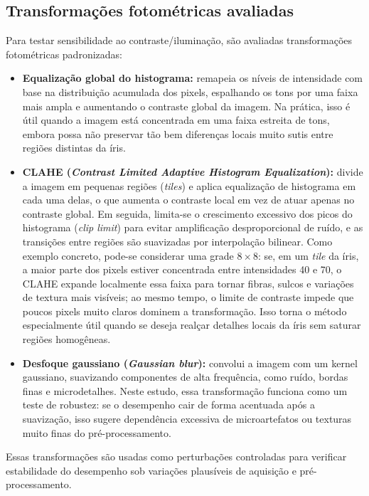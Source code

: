 \documentclass[11pt,a4paper]{article}
\begin{document}
\subsection{Transformações fotométricas avaliadas}
\label{ref:transformacoes}
Para testar sensibilidade ao contraste/iluminação, são avaliadas transformações fotométricas padronizadas:
\begin{itemize}
    \item \textbf{Equalização global do histograma:} remapeia os níveis de intensidade com base na distribuição acumulada dos pixels, espalhando os tons por uma faixa mais ampla e aumentando o contraste global da imagem. Na prática, isso é útil quando a imagem está concentrada em uma faixa estreita de tons, embora possa não preservar tão bem diferenças locais muito sutis entre regiões distintas da íris. \citep{OpenCVHistEq}

    \item \textbf{CLAHE (\textit{Contrast Limited Adaptive Histogram Equalization}):} divide a imagem em pequenas regiões (\textit{tiles}) e aplica equalização de histograma em cada uma delas, o que aumenta o contraste local em vez de atuar apenas no contraste global. Em seguida, limita-se o crescimento excessivo dos picos do histograma (\textit{clip limit}) para evitar amplificação desproporcional de ruído, e as transições entre regiões são suavizadas por interpolação bilinear. Como exemplo concreto, pode-se considerar uma grade \(8\times 8\): se, em um \textit{tile} da íris, a maior parte dos pixels estiver concentrada entre intensidades 40 e 70, o CLAHE expande localmente essa faixa para tornar fibras, sulcos e variações de textura mais visíveis; ao mesmo tempo, o limite de contraste impede que poucos pixels muito claros dominem a transformação. Isso torna o método especialmente útil quando se deseja realçar detalhes locais da íris sem saturar regiões homogêneas. \citep{Zuiderveld1994CLAHE,OpenCVHistEq}

    \item \textbf{Desfoque gaussiano (\textit{Gaussian blur}):} convolui a imagem com um kernel gaussiano, suavizando componentes de alta frequência, como ruído, bordas finas e microdetalhes. Neste estudo, essa transformação funciona como um teste de robustez: se o desempenho cair de forma acentuada após a suavização, isso sugere dependência excessiva de microartefatos ou texturas muito finas do pré-processamento. \citep{OpenCVSmoothing}
\end{itemize}

Essas transformações são usadas como perturbações controladas para verificar estabilidade do desempenho sob variações plausíveis de aquisição e pré-processamento.
\end{document}
